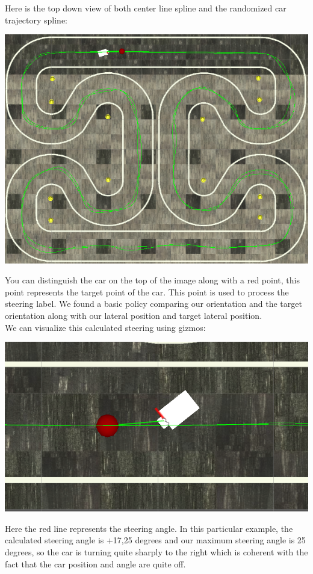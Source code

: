 \documentclass[12pt]{article}
\begin{document}
Here is the top down view of both center line spline and the randomized car trajectory spline: \\ 
\centerline{\includegraphics[width=15cm]{../../docs/splines.png}} 

You can distinguish the car on the top of the image along with a red point, this point represents the target point of the car. This point is used to process the steering label. We found a basic policy comparing our orientation and the target orientation along with our lateral position and target lateral position. \\

We can visualize this calculated steering using gizmos: \\ 
\centerline{\includegraphics[width=15cm]{../../docs/sim-steering.png}} 

\newpage
Here the red line represents the steering angle. In this particular example, the calculated steering angle is +17,25 degrees and our maximum steering angle is 25 degrees, so the car is turning quite sharply to the right which is coherent with the fact that the car position and angle are quite off. \\
\end{document}
